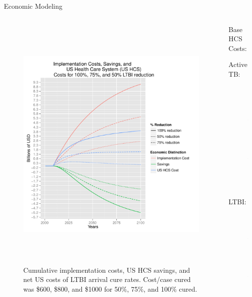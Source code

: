 \documentclass[final]{beamer}
\begin{document}
\begin{frame}
\begin{columns}
\begin{column}{.3\textwidth}
\begin{block}{Economic Modeling}
\begin{columns}
\begin{column}{.66\textwidth}
\begin{figure}[h]
\begin{center}
                \includegraphics[width=\textwidth,height=13cm]{EnLTBIRedGroupCost.pdf}
              \end{center}
              \caption{Cumulative implementation costs, US HCS savings, and net
                       US costs of LTBI arrival cure rates. Cost/case cured was
                       \$600, \$800, and \$1000 for 50\%, 75\%, and 100\%
                       cured.}
              \label{fig:redEnLTBI_costs}
            \end{figure}
          \end{column}
          \begin{column}{.26\textwidth}
            Base HCS Costs:
            \begin{description}
              \item[Active TB:]\hfill \\ 
                \$14,014.90
              \item[LTBI:]\hfill \\ 
                \$403.45
            \end{description}
          \end{column}
        \end{columns}
      \end{block}
    \end{column}


\end{columns}
\end{frame}
\end{document}
